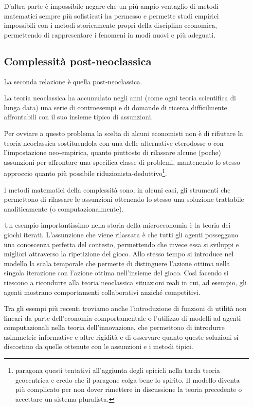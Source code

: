 \documentclass[a4paper, headings=standardclasses]{scrartcl}
\begin{document}
D'altra parte è impossibile negare che un più ampio ventaglio di metodi matematici sempre più sofisticati ha permesso e permette studi empirici impossibili con i metodi storicamente propri della disciplina economica, permettendo di rappresentare i fenomeni in modi nuovi e più adeguati.

\subsection{Complessità post-neoclassica}
La seconda relazione è quella post-neoclassica.

La teoria neoclassica ha accumulato negli anni (come ogni teoria scientifica di lunga data) una serie di controesempi e di domande di ricerca difficilmente affrontabili con il suo insieme tipico di assunzioni.

Per ovviare a questo problema la scelta di alcuni economisti non è di rifiutare la teoria neoclassica sostituendola con una delle alternative eterodosse o con l'impostazione neo-empirica, quanto piuttosto di rilassare alcune (poche) assunzioni per affrontare una specifica classe di problemi, mantenendo lo stesso approccio quanto più possibile riduzionista-deduttivo\footnote{\textcite{kanazawa2021} paragona questi tentativi all'aggiunta degli epicicli nella tarda teoria geocentrica e credo che il paragone colga bene lo spirito. Il modello diventa più complicato per non dover rimettere in discussione la teoria precedente o accettare un sistema pluralista.}.

I metodi matematici della complessità sono, in alcuni casi, gli strumenti che permettono di rilassare le assunzioni ottenendo lo stesso una soluzione trattabile analiticamente (o computazionalmente).

Un esempio importantissimo nella storia della microeconomia è la teoria dei giochi iterati. L'assunzione che viene rilassata è che tutti gli agenti posseggano una conoscenza perfetta del contesto, permettendo che invece essa si sviluppi e migliori attraverso la ripetizione del gioco. Allo stesso tempo si introduce nel modello la scala temporale che permette di distinguere l'azione ottima nella singola iterazione con l'azione ottima nell'insieme del gioco.
Così facendo si riescono a ricondurre alla teoria neoclassica situazioni reali in cui, ad esempio, gli agenti mostrano comportamenti collaborativi anziché competitivi.

Tra gli esempi più recenti troviamo anche l'introduzione di funzioni di utilità non lineari da parte dell'economia comportamentale o l'utilizzo di modelli ad agenti computazionali nella teoria dell'innovazione, che permettono di introdurre asimmetrie informative e altre rigidità e di osservare quanto queste soluzioni si discostino da quelle ottenute con le assunzioni e i metodi tipici.
\end{document}
